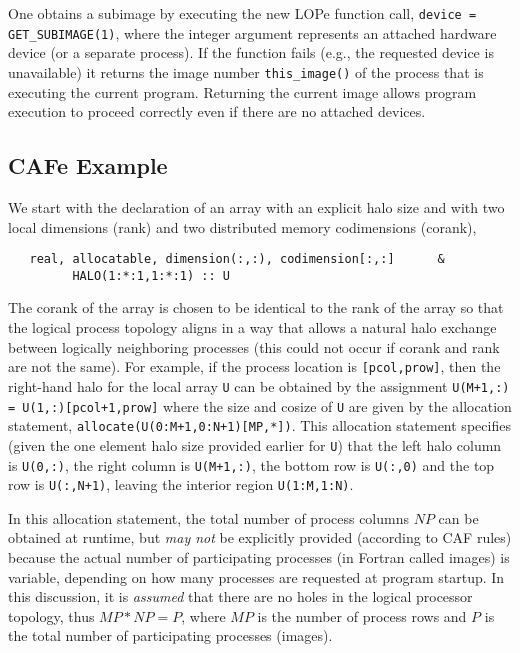 One obtains a subimage by executing the new LOPe function call, \texttt{device = GET\_SUBIMAGE(1)},
where the integer argument represents an attached hardware device (or a separate process).
If the function fails (e.g., the requested device is unavailable) it returns the image number
\texttt{this\_image()} of the process that is executing the current program.  Returning the current
image allows program execution to proceed correctly even if there are no attached devices.

\subsection{CAFe Example}

We start with the declaration of an array with an explicit halo size and with two local
dimensions (rank) and two distributed memory codimensions (corank),
\begin{verbatim}
   real, allocatable, dimension(:,:), codimension[:,:]      &
         HALO(1:*:1,1:*:1) :: U
\end{verbatim}
The corank of the array is chosen to be identical to the rank of the array so that the logical
process topology aligns in a way that allows a natural halo exchange between logically neighboring
processes (this could not occur if corank and rank are not the same).  For example, if the process
location is \texttt{[pcol,prow]}, then the right-hand halo for the local array \texttt{U} can be
obtained by the assignment
\texttt{U(M+1,:) = U(1,:)[pcol+1,prow]} where the size and cosize of
\texttt{U} are given by the allocation statement,
\texttt{allocate(U(0:M+1,0:N+1)[MP,*])}.
This allocation statement specifies (given the one element halo size provided earlier for
\texttt{U}) that the left halo column is \texttt{U(0,:)}, the right column is \texttt{U(M+1,:)},
the bottom row is \texttt{U(:,0)} and the top row is \texttt{U(:,N+1)}, leaving the interior region
\texttt{U(1:M,1:N)}.

In this allocation statement, the total number of process columns $NP$ can be obtained at runtime,
but \emph{may not} be explicitly provided (according to CAF rules) because the actual number of
participating processes (in Fortran called images) is variable, depending on how many processes are
requested at program startup.  In this discussion, it is \emph{assumed} that there are no holes in
the logical processor topology, thus $MP*NP = P$, where $MP$ is the number of process rows and $P$
is the total number of participating processes (images).

